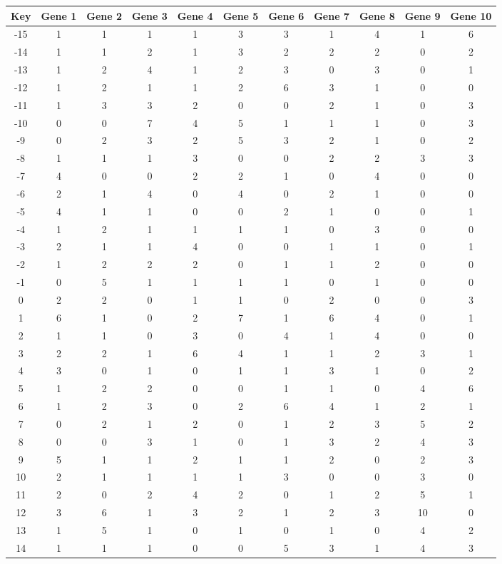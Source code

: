\begin{tabular}{|c|c|c|c|c|c|c|c|c|c|c|}
\hline
Key & Gene 1 & Gene 2 & Gene 3 & Gene 4 & Gene 5 & Gene 6 & Gene 7 & Gene 8 & Gene 9 & Gene 10 \\
\hline
-15 & 1 & 1 & 1 & 1 & 3 & 3 & 1 & 4 & 1 & 6 \\
-14 & 1 & 1 & 2 & 1 & 3 & 2 & 2 & 2 & 0 & 2 \\
-13 & 1 & 2 & 4 & 1 & 2 & 3 & 0 & 3 & 0 & 1 \\
-12 & 1 & 2 & 1 & 1 & 2 & 6 & 3 & 1 & 0 & 0 \\
-11 & 1 & 3 & 3 & 2 & 0 & 0 & 2 & 1 & 0 & 3 \\
-10 & 0 & 0 & 7 & 4 & 5 & 1 & 1 & 1 & 0 & 3 \\
-9 & 0 & 2 & 3 & 2 & 5 & 3 & 2 & 1 & 0 & 2 \\
-8 & 1 & 1 & 1 & 3 & 0 & 0 & 2 & 2 & 3 & 3 \\
-7 & 4 & 0 & 0 & 2 & 2 & 1 & 0 & 4 & 0 & 0 \\
-6 & 2 & 1 & 4 & 0 & 4 & 0 & 2 & 1 & 0 & 0 \\
-5 & 4 & 1 & 1 & 0 & 0 & 2 & 1 & 0 & 0 & 1 \\
-4 & 1 & 2 & 1 & 1 & 1 & 1 & 0 & 3 & 0 & 0 \\
-3 & 2 & 1 & 1 & 4 & 0 & 0 & 1 & 1 & 0 & 1 \\
-2 & 1 & 2 & 2 & 2 & 0 & 1 & 1 & 2 & 0 & 0 \\
-1 & 0 & 5 & 1 & 1 & 1 & 1 & 0 & 1 & 0 & 0 \\
0 & 2 & 2 & 0 & 1 & 1 & 0 & 2 & 0 & 0 & 3 \\
1 & 6 & 1 & 0 & 2 & 7 & 1 & 6 & 4 & 0 & 1 \\
2 & 1 & 1 & 0 & 3 & 0 & 4 & 1 & 4 & 0 & 0 \\
3 & 2 & 2 & 1 & 6 & 4 & 1 & 1 & 2 & 3 & 1 \\
4 & 3 & 0 & 1 & 0 & 1 & 1 & 3 & 1 & 0 & 2 \\
5 & 1 & 2 & 2 & 0 & 0 & 1 & 1 & 0 & 4 & 6 \\
6 & 1 & 2 & 3 & 0 & 2 & 6 & 4 & 1 & 2 & 1 \\
7 & 0 & 2 & 1 & 2 & 0 & 1 & 2 & 3 & 5 & 2 \\
8 & 0 & 0 & 3 & 1 & 0 & 1 & 3 & 2 & 4 & 3 \\
9 & 5 & 1 & 1 & 2 & 1 & 1 & 2 & 0 & 2 & 3 \\
10 & 2 & 1 & 1 & 1 & 1 & 3 & 0 & 0 & 3 & 0 \\
11 & 2 & 0 & 2 & 4 & 2 & 0 & 1 & 2 & 5 & 1 \\
12 & 3 & 6 & 1 & 3 & 2 & 1 & 2 & 3 & 10 & 0 \\
13 & 1 & 5 & 1 & 0 & 1 & 0 & 1 & 0 & 4 & 2 \\
14 & 1 & 1 & 1 & 0 & 0 & 5 & 3 & 1 & 4 & 3 \\
\hline
\end{tabular}